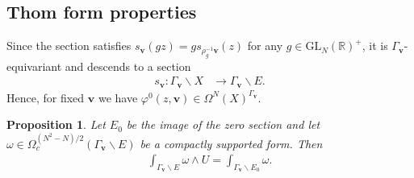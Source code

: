 \documentclass[a4paper,11pt]{amsart} %
\newcommand{\8}{\infty}
\newcommand{\vbf}{\mathbf{v}}
\newcommand{\GL}{\mathrm{GL}}
\newcommand{\R}{\mathbb{R}}
\theoremstyle{mytheoremstyle}
\newtheorem{prop}[thm]{Proposition}
\theoremstyle{remark}
\numberwithin{equation}{section}
\begin{document}
\subsection{Thom form properties}

Since the section satisfies $s_\vbf(gz)=g s_{\rho_g^{-1}\vbf}(z)$ for any $g \in \GL_N(\R)^+$, it is $\Gamma_\vbf$-equivariant and descends to a section
\begin{align}
    s_\vbf \colon \Gamma_\vbf \backslash X & \longrightarrow \Gamma_\vbf \backslash E.
\end{align}
Hence, for fixed $\vbf$ we have $\varphi^0(z,\vbf) \in \Omega^N(X)^{\Gamma_{\vbf}}$.

\begin{prop} \cite[Proposition.~6.24(b)]{botu} \label{thomformprop} Let $E_0$ be the image of the zero section and let $\omega \in \Omega_c^{(N^2-N)/2}(\Gamma_\vbf \backslash E)$ be a compactly supported form. Then
\begin{align} \label{integralU}
\int_{\Gamma_\vbf \backslash E} \omega \wedge U=\int_{\Gamma_\vbf \backslash E_0} \omega.
\end{align}
\end{prop}

\end{document}
